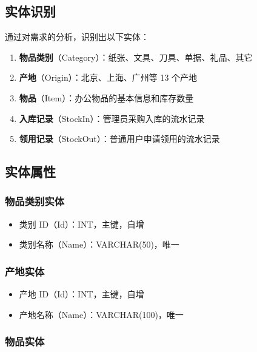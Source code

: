 \documentclass[12pt,a4paper]{ctexart}
\begin{document}
\subsection{实体识别}

通过对需求的分析，识别出以下实体：

\begin{enumerate}
    \item \textbf{物品类别}（Category）：纸张、文具、刀具、单据、礼品、其它
    \item \textbf{产地}（Origin）：北京、上海、广州等 13 个产地
    \item \textbf{物品}（Item）：办公物品的基本信息和库存数量
    \item \textbf{入库记录}（StockIn）：管理员采购入库的流水记录
    \item \textbf{领用记录}（StockOut）：普通用户申请领用的流水记录
\end{enumerate}

\subsection{实体属性}

\subsubsection{物品类别实体}

\begin{itemize}
    \item 类别 ID（Id）：INT，主键，自增
    \item 类别名称（Name）：VARCHAR(50)，唯一
\end{itemize}

\subsubsection{产地实体}

\begin{itemize}
    \item 产地 ID（Id）：INT，主键，自增
    \item 产地名称（Name）：VARCHAR(100)，唯一
\end{itemize}

\subsubsection{物品实体}
\end{document}
